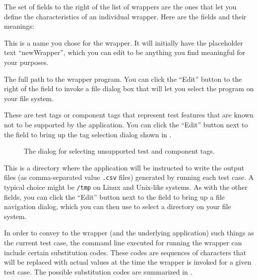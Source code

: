 \documentclass{sbmlpkgspec}
\begin{document}
The set of fields to the right of the list of wrappers are the ones that let you define the characteristics of an individual wrapper.  Here are the fields and their meanings:

\begin{description}[style=multiline,leftmargin=1.4in]

\item[Name] This is a name you chose for the wrapper.  It will initially have the placeholder text ``newWrapper'', which you can edit to be anything you find meaningful for your purposes.

\item[Wrapper path] The full path to the wrapper program. You can click the ``Edit'' button to the right of the field to invoke a file dialog box that will let you select the program on your file system.

\item[Unsupported tags] These are test tags or component tags that represent test features that are known not to be supported by the application.  You can click the ``Edit'' button next to the field to bring up the tag selection dialog shown in .

\begin{figure}[h]
  \caption{The dialog for selecting unsupported test and component tags.}
  \label{tag-selection}
\end{figure}

\item[Output directory] This is a directory where the application will be instructed to write the output files (as comma-separated value \texttt{.csv} files) generated by running each test case.  A typical choice might be \texttt{/tmp} on Linux and Unix-like systems.  As with the other fields, you can click the ``Edit'' button next to the field to bring up a file navigation dialog, which you can then use to select a directory on your file system.

\item[Arguments to wrapper] In order to convey to the wrapper (and the underlying application) such things as the current test case, the command line executed for running the wrapper can include certain substitution codes.  These codes are sequences of characters that will be replaced with actual values at the time the wrapper is invoked for a given test case.  The possible substitution codes are summarized in .


\end{description}
\end{document}
